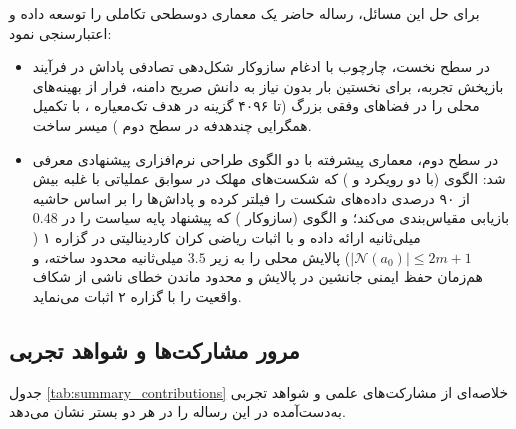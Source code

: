 \documentclass[oneside,openany,phd]{TMU-Thesis}
\begin{document}
برای حل این مسائل، رساله حاضر یک معماری دوسطحی تکاملی را توسعه داده و اعتبارسنجی نمود:
\begin{itemize}
    \item در سطح نخست، چارچوب  با ادغام سازوکار شکل‌دهی تصادفی پاداش در فرآیند بازپخش تجربه، برای نخستین بار بدون نیاز به دانش صریح دامنه، فرار از بهینه‌های محلی را در فضاهای وفقی بزرگ (تا ۴۰۹۶ گزینه در هدف تک‌معیاره ، با تکمیل همگرایی چندهدفه در سطح دوم \rsdrlplus) میسر ساخت.
    \item در سطح دوم، معماری پیشرفته \rsdrlplus با دو الگوی طراحی نرم‌افزاری پیشنهادی معرفی شد: الگوی \sgos (با دو رویکرد \mursdrl و \cmrsdrl) که شکست‌های مهلک در سوابق عملیاتی با غلبه بیش از ۹۰ درصدی داده‌های شکست را فیلتر کرده و پاداش‌ها را بر اساس حاشیه بازیابی مقیاس‌بندی می‌کند؛ و الگوی \caepv (سازوکار \pgalr) که پیشنهاد پایه سیاست را در $0.48$ میلی‌ثانیه ارائه داده و با اثبات ریاضی کران کاردینالیتی در گزاره ۱ ($|\mathcal{N}(a_0)| \le 2m + 1$) پالایش محلی را به زیر $3.5$ میلی‌ثانیه محدود ساخته، و هم‌زمان حفظ ایمنی جانشین در پالایش و محدود ماندن خطای ناشی از شکاف واقعیت را با گزاره ۲ اثبات می‌نماید.
\end{itemize}

\subsection{مرور مشارکت‌ها و شواهد تجربی}

جدول \ref{tab:summary_contributions} خلاصه‌ای از مشارکت‌های علمی و شواهد تجربی به‌دست‌آمده در این رساله را در هر دو بستر نشان می‌دهد.
\end{document}
